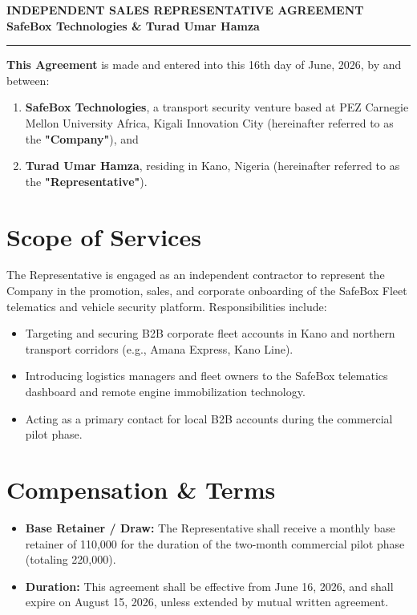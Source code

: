 \documentclass[11pt,a4paper]{article}
\begin{document}
\begin{center}
    \large\textbf{INDEPENDENT SALES REPRESENTATIVE AGREEMENT} \\
    \vspace{0.2cm}
    \textbf{SafeBox Technologies \& Turad Umar Hamza} \\
    \rule{\linewidth}{0.5pt}
\end{center}

\vspace{0.3cm}

\noindent \textbf{This Agreement} is made and entered into this 16th day of June, 2026, by and between:
\begin{enumerate}
    \item \textbf{SafeBox Technologies}, a transport security venture based at PEZ Carnegie Mellon University Africa, Kigali Innovation City (hereinafter referred to as the \textbf{"Company"}), and
    \item \textbf{Turad Umar Hamza}, residing in Kano, Nigeria (hereinafter referred to as the \textbf{"Representative"}).
\end{enumerate}

\section{Scope of Services}
The Representative is engaged as an independent contractor to represent the Company in the promotion, sales, and corporate onboarding of the SafeBox Fleet telematics and vehicle security platform. Responsibilities include:
\begin{itemize}
    \item Targeting and securing B2B corporate fleet accounts in Kano and northern transport corridors (e.g., Amana Express, Kano Line).
    \item Introducing logistics managers and fleet owners to the SafeBox telematics dashboard and remote engine immobilization technology.
    \item Acting as a primary contact for local B2B accounts during the commercial pilot phase.
\end{itemize}

\section{Compensation \& Terms}
\begin{itemize}
    \item \textbf{Base Retainer / Draw:} The Representative shall receive a monthly base retainer of 110,000 for the duration of the two-month commercial pilot phase (totaling 220,000).
    \item \textbf{Duration:} This agreement shall be effective from June 16, 2026, and shall expire on August 15, 2026, unless extended by mutual written agreement.
\end{itemize}
\end{document}
